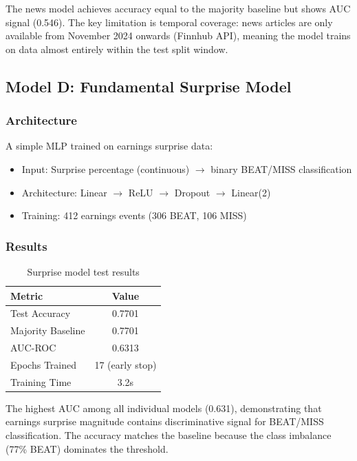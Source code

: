 \documentclass[12pt,a4paper]{article}
\begin{document}
\noindent The news model achieves accuracy equal to the majority baseline but shows AUC signal (0.546). The key limitation is temporal coverage: news articles are only available from November 2024 onwards (Finnhub API), meaning the model trains on data almost entirely within the test split window.

\subsection{Model D: Fundamental Surprise Model}

\subsubsection{Architecture}

A simple MLP trained on earnings surprise data:
\begin{itemize}[noitemsep]
    \item Input: Surprise percentage (continuous) $\rightarrow$ binary BEAT/MISS classification
    \item Architecture: Linear $\rightarrow$ ReLU $\rightarrow$ Dropout $\rightarrow$ Linear(2)
    \item Training: 412 earnings events (306 BEAT, 106 MISS)
\end{itemize}

\subsubsection{Results}

\begin{table}[H]
\centering
\begin{tabular}{lc}
\toprule
\textbf{Metric} & \textbf{Value} \\
\midrule
Test Accuracy & 0.7701 \\
Majority Baseline & 0.7701 \\
AUC-ROC & 0.6313 \\
Epochs Trained & 17 (early stop) \\
Training Time & 3.2s \\
\bottomrule
\end{tabular}
\caption{Surprise model test results}
\label{tab:surprise_results}
\end{table}

\noindent The highest AUC among all individual models (0.631), demonstrating that earnings surprise magnitude contains discriminative signal for BEAT/MISS classification. The accuracy matches the baseline because the class imbalance (77\% BEAT) dominates the threshold.
\end{document}
